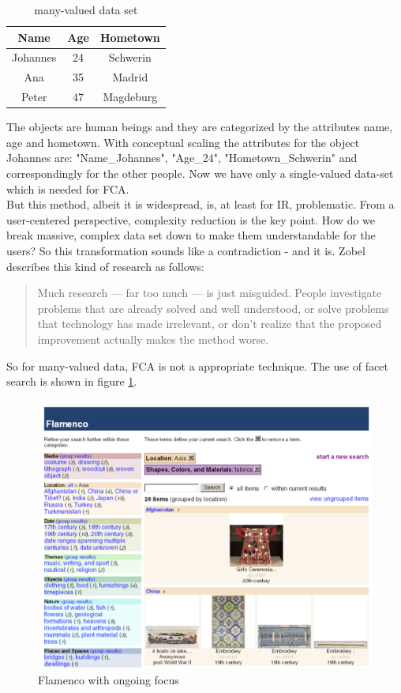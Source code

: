 \documentclass[11pt]{report}
\begin{document}
\begin{table}[h]
\caption{many-valued data set}
\label{table:manyvalued}
\centering

\def\arraystretch{1.2}%
\begin{tabular}{ c c c }
\hline
 Name & Age & Hometown \\
\hline
Johannes & 24 & Schwerin \\
Ana & 35 & Madrid \\
Peter & 47 & Magdeburg \\
\hline
\end{tabular}
\end{table}

The objects are human beings and they are categorized by the attributes name, age and hometown. With conceptual scaling  the attributes for the object Johannes are: "Name\_Johannes", "Age\_24", "Hometown\_Schwerin" and correspondingly for the other people. Now we have only a single-valued data-set which is needed for FCA. \\

But this method, albeit it is widespread, is, at least for IR, problematic. From a user-centered perspective, complexity reduction is the key point. How do we break massive, complex data set down to make them understandable for the users? So this transformation sounds like a contradiction - and it is. Zobel describes this kind of research as follows:

\begin{quote}
Much research — far too much — is just misguided. People investigate problems that are already solved and well understood, or solve problems that technology has made irrelevant, or don’t realize that the proposed improvement actually makes the method worse.
\end{quote}

So for many-valued data, FCA is not a appropriate technique. The use of facet search is shown in figure \ref{figure:flamenco}. \\

\begin{figure}[!ht]
	\centering
	\includegraphics[width=\linewidth]{images/flamenco}
\caption{Flamenco with ongoing focus}
\label{figure:flamenco}
\end{figure}
\end{document}
